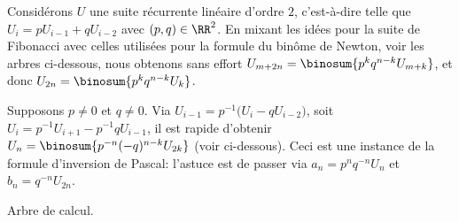 

\begin{remark}
    Considérons $U$ une suite récurrente linéaire d'ordre $2$,
    c'est-à-dire telle que
    $U_{i} = p U_{i-1} + q U_{i-2}$ avec $(p, q) \in \RR^2$.
    En mixant les idées pour la suite de Fibonacci avec celles utilisées pour la formule du binôme de Newton, voir les arbres ci-dessous, nous obtenons sans effort
    $U_{m+2n} = \binosum{p^k q^{n-k} U_{m+k}}$,
    et donc
    $U_{2n} = \binosum{p^k q^{n-k} U_{k}}$.

                {\intertree}{}


    Supposons $p \neq 0$ et $q \neq 0$.
    Via  $U_{i-1} = p^{-1} \big( U_{i} - q U_{i-2} \big)$,
    soit $U_{i} = p^{-1} U_{i+1} - p^{-1} q U_{i-1}$,
    il est rapide d'obtenir
    $U_n = \binosum{p^{-n} (-q)^{n-k} U_{2k}}$ (voir ci-dessous).
    Ceci est une instance de la formule d'inversion de Pascal:
    l'astuce est de passer via
    $a_n = p^n q^{-n} U_{n}$
    et
    $b_n = q^{-n} U_{2n}$.

    \begin{center}
        \itshape\centering


        Arbre de calcul.
    \end{center}
\end{remark}
